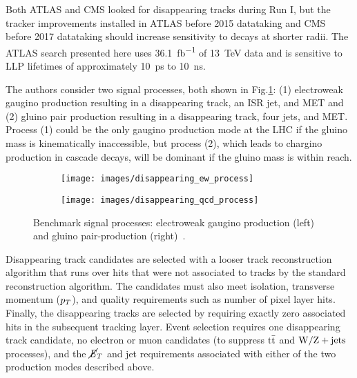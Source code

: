 \documentclass[12pt]{article}
\begin{document}
        Both ATLAS and CMS looked for disappearing tracks during Run I, but the tracker improvements installed in ATLAS before 2015 datataking and CMS before 2017 datataking should increase sensitivity to decays at shorter radii. The ATLAS search presented here uses \SI{36.1}{\femto\barn^{-1}} of \SI{13}{\tera\electronvolt} data and is sensitive to LLP lifetimes of approximately \SI{10}{\pico\s} to \SI{10}{\nano\s}.

        The authors consider two signal processes, both shown in Fig.\ref{disappearing_processes}: (1) electroweak gaugino production resulting in a disappearing track, an ISR jet, and MET and (2) gluino pair production resulting in a disappearing track, four jets, and MET. Process (1) could be the only gaugino production mode at the LHC if the gluino mass is kinematically inaccessible, but process (2), which leads to chargino production in cascade decays, will be dominant if the gluino mass is within reach.

        \noindent \begin{figure}[htbp] \begin{center}
        \begin{subfigure}[htbp]{0.2\textwidth} \begin{center}
        \texttt{[image: images/disappearing\_ew\_process]}
        \end{center} \end{subfigure}
        \qquad
        \begin{subfigure}[htbp]{0.2\textwidth} \begin{center}
        \texttt{[image: images/disappearing\_qcd\_process]}
        \end{center} \end{subfigure}
        \caption{Benchmark signal processes: electroweak gaugino production (left) and gluino pair-production (right)~\cite{atlas_disappearing}.}
        \label{disappearing_processes}
        \end{center} \end{figure}

        Disappearing track candidates are selected with a looser track reconstruction algorithm that runs over hits that were not associated to tracks by the standard reconstruction algorithm. The candidates must also meet isolation, transverse momentum ($p_T$), and quality requirements such as number of pixel layer hits. Finally, the disappearing tracks are selected by requiring exactly zero associated hits in the subsequent tracking layer. Event selection requires one disappearing track candidate, no electron or muon candidates (to suppress $\mathrm{t}\bar{\mathrm{t}}$ and $\mathrm{W}/\mathrm{Z} + \mathrm{jets}$ processes), and the $\cancel{\it{E}}_{T}$ and jet requirements associated with either of the two production modes described above.
\end{document}
